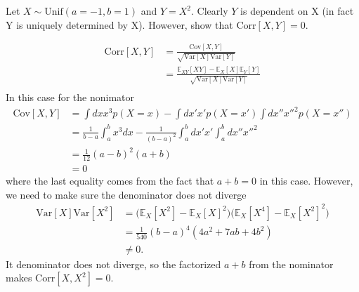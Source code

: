\begin{example}
	Let $X\sim \text{Unif}(a=-1, b=1)$ and $Y=X^2$. Clearly $Y$ is dependent on X (in fact Y is uniquely determined by X). However, show that $\text{Corr}[X,Y]=0$.
	
	\begin{equation}
		\begin{split}
			\text{Corr}[X,Y] & = \frac{\text{Cov}[X,Y]}{\sqrt{\text{Var}[X]\text{Var}[Y]}}\\
			& = \frac{\mathbb{E}_{XY}[XY]-\mathbb{E}_X[X]\mathbb{E}_Y[Y]}{\sqrt{\text{Var}[X]\text{Var}[Y]}}\\
		\end{split}
	\end{equation}
	In this case for the nonimator
	\begin{equation}
		\begin{split}
			\text{Cov}[X,Y] &= \int dx x^3 p(X = x)-\int dx' x'p(X = x')\int dx'' x''^2p(X = x'')\\
			&= \frac{1}{b-a}\int_{a}^{b}x^3dx-\frac{1}{(b-a)^2}\int_{a}^{b}dx' x'\int_{a}^{b}dx'' x''^2\\
			&= \frac{1}{12}(a-b)^2(a+b)\\
			&=0
		\end{split}
	\end{equation}
	where the last equality comes from the fact that $a+b = 0$ in this case. However, we need to make sure the denominator does not diverge
	\begin{equation}
		\begin{split}
			\text{Var}[X]\text{Var}[X^2] & =\big(\mathbb{E}_X[X^2]-\mathbb{E}_X[X]^2\big) \big(\mathbb{E}_X[X^4]-\mathbb{E}_X[X^2]^2\big)\\
			& = \frac{1}{540}(b-a)^4(4a^2+7ab+4b^2)\\
			&\neq 0.
		\end{split}
	\end{equation}
	It denominator does not diverge, so the factorized $a+b$ from the nominator makes $\text{Corr}[X,X^2]=0$.
\end{example}

